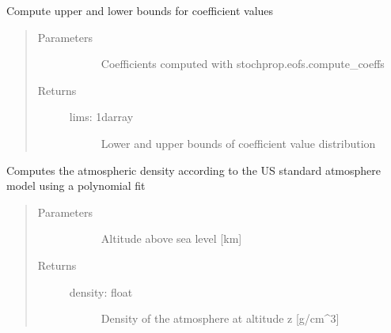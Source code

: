 \documentclass[letterpaper,10pt,english]{sphinxmanual}
\begin{document}
\begin{fulllineitems}
\label{\detokenize{stochprop.eofs:stochprop.eofs.define_coeff_limits}}
\sphinxAtStartPar
Compute upper and lower bounds for coefficient values
\begin{quote}\begin{description}
\item[{Parameters}] \leavevmode\begin{description}
\item[{}] \leavevmode
\sphinxAtStartPar
Coefficients computed with stochprop.eofs.compute\_coeffs

\end{description}

\item[{Returns}] \leavevmode\begin{description}
\item[{lims: 1darray}] \leavevmode
\sphinxAtStartPar
Lower and upper bounds of coefficient value distribution

\end{description}

\end{description}\end{quote}

\end{fulllineitems}


\begin{fulllineitems}
\label{\detokenize{stochprop.eofs:stochprop.eofs.density}}
\sphinxAtStartPar
Computes the atmospheric density according to the US standard atmosphere model using a polynomial fit
\begin{quote}\begin{description}
\item[{Parameters}] \leavevmode\begin{description}
\item[{}] \leavevmode
\sphinxAtStartPar
Altitude above sea level {[}km{]}

\end{description}

\item[{Returns}] \leavevmode\begin{description}
\item[{density: float}] \leavevmode
\sphinxAtStartPar
Density of the atmosphere at altitude z {[}g/cm\textasciicircum{}3{]}

\end{description}

\end{description}\end{quote}

\end{fulllineitems}
\end{document}
